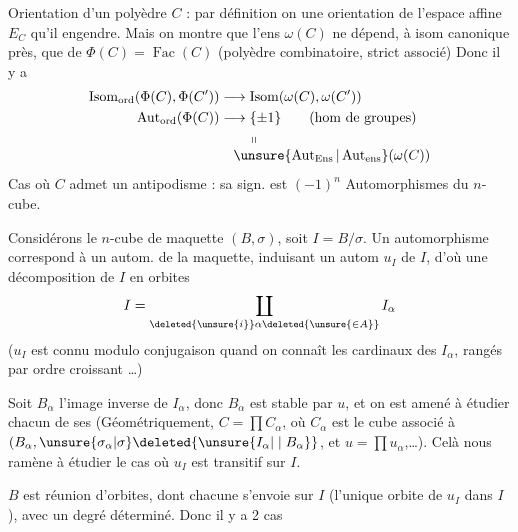 Orientation d'un polyèdre  $C$ : par définition on  une orientation de l'espace affine $E_C$ qu'il engendre.  Mais on montre que l'ens $\omega(C)$ ne dépend, à isom canonique près, que de $\Phi(C)=\operatorname{Fac}(C)$ (polyèdre combinatoire, strict associé) Donc il y a 
\[
\begin{aligned}
\operatorname{Isom}_{\mathrm{ord}}(\Phi(C),\Phi(C'))&\longrightarrow\operatorname{Isom}(\omega(C),\omega(C'))\\
\operatorname{Aut}_{\mathrm{ord}}(\Phi(C))&\longrightarrow\{\pm1\}\qquad\text{(hom de groupes)}\\
&\hspace{2em}\shortparallel\\[-3pt]
&\hspace{1em}\unsure{\operatorname{Aut}_{\mathrm{Ens}}|\operatorname{Aut}_{\mathrm{ens}}}(\omega(C))
\end{aligned}
\]
Cas où $C$ admet un antipodisme : sa sign. est $(-1)^n$
Automorphismes du $n$-cube.

Considérons le $n$-cube de maquette $(B,\sigma)$, soit $I=B/\sigma$. Un automorphisme correspond à un autom.  de la maquette, induisant un autom $u_I$ de $I$, d'où une décomposition de $I$ en orbites
\[
 I=\coprod_{\deleted{\unsure{i}}\alpha\deleted{\unsure{\in A}}}I_\alpha
\]
($u_I$ est connu modulo conjugaison quand on connaît les cardinaux des $I_\alpha$, rangés par ordre croissant \ldots)

Soit $B_\alpha$ l'image inverse de $I_\alpha$, donc $B_\alpha$ est stable par $u$,    et on est amené à étudier chacun de ses  (Géométriquement, $C=\prod C_\alpha$, où $C_\alpha$ est le cube associé à $(B_\alpha,\unsure{\sigma_\alpha|\sigma}\deleted{\unsure{I_\alpha|\mid B_\alpha}}$, et $u=\prod u_\alpha$,\ldots). Celà nous ramène à étudier le cas où $u_I$ est transitif sur $I$.

$B$ est réunion d'orbites, dont chacune s'envoie sur $I$ (l'unique orbite  de $u_I$ dans $I$), avec un degré déterminé. Donc il y a 2 cas

